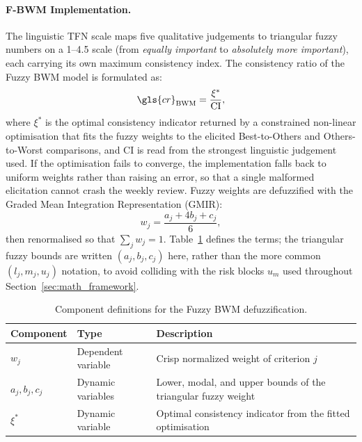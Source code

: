 \paragraph{F-BWM Implementation.}
The linguistic TFN scale maps five qualitative judgements to triangular fuzzy numbers on a
1--4.5 scale (from \textit{equally important} to \textit{absolutely more important}), each carrying
its own maximum consistency index. The consistency ratio of the Fuzzy BWM model is formulated as:
\begin{equation}
    \gls{cr}_{\text{BWM}} = \frac{\xi^*}{\text{CI}},
    \label{eq:bwm_cr}
\end{equation}
where $\xi^*$ is the optimal consistency indicator returned by a constrained non-linear
optimisation that fits the fuzzy weights to the elicited Best-to-Others and
Others-to-Worst comparisons, and $\text{CI}$ is read from the strongest linguistic judgement used.
If the optimisation fails to converge, the implementation falls back to uniform weights rather than
raising an error, so that a single malformed elicitation cannot crash the weekly review. Fuzzy
weights are defuzzified with the Graded Mean Integration Representation (GMIR):
\begin{equation}
    w_j = \frac{a_j + 4 b_j + c_j}{6},
    \label{eq:bwm_defuzz}
\end{equation}
then renormalised so that $\sum_j w_j = 1$. Table~\ref{tab:bwm_defuzz_components} defines the terms; the triangular fuzzy bounds are written $(a_j, b_j, c_j)$ here, rather than the more common $(l_j, m_j, u_j)$ notation, to avoid colliding with the risk blocks $u_m$ used throughout Section~\ref{sec:math_framework}.

\begin{table}[H]
\centering
\caption{Component definitions for the Fuzzy BWM defuzzification.}
\label{tab:bwm_defuzz_components}
\small
\begin{tabularx}{\linewidth}{llX}
\toprule
\textbf{Component} & \textbf{Type} & \textbf{Description} \\
\midrule
$w_j$ & Dependent variable & Crisp normalized weight of criterion $j$ \\
$a_j, b_j, c_j$ & Dynamic variables & Lower, modal, and upper bounds of the triangular fuzzy weight \\
$\xi^*$ & Dynamic variable & Optimal consistency indicator from the fitted optimisation \\
\bottomrule
\end{tabularx}
\end{table}

